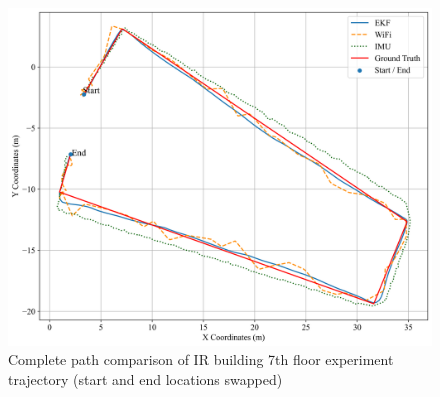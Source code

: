 \documentclass[12pt,a4paper]{article}
\numberwithin{equation}{section}
\begin{document}
\begin{figure}[H]
    \centering
    \includegraphics[width=0.8\linewidth]{images/1/0.png}
    \caption{Complete path comparison of IR building 7th floor experiment trajectory (start and end locations swapped)}
    \label{fig:Complete path comparison of IR building 7th floor experiment trajectory (start and end locations swapped)}
\end{figure}
\end{document}
